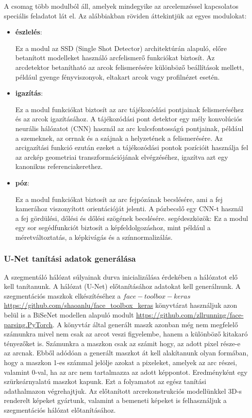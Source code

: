 \documentclass[12pt,a4]{article}
\begin{document}
    A csomag több modulból áll, amelyek mindegyike az arcelemzéssel kapcsolatos speciális feladatot lát el. Az alábbiakban röviden áttekintjük az egyes modulokat:

    \begin{itemize}
        \item \textbf{észlelés}: 
        
        Ez a modul az SSD (Single Shot Detector) architektúrán alapuló, előre betanított modelleket használó arcfelismerő funkciókat biztosít. Az arcdetektor betanítható az arcok felismerésére különböző beállítások mellett, például gyenge fényviszonyok, eltakart arcok vagy profilnézet esetén.

        \item \textbf{igazítás}: 
        
        Ez a modul funkciókat biztosít az arc tájékozódási pontjainak felismeréséhez és az arcok igazításához.
		A tájékozódási pont detektor egy mély konvolúciós neurális hálózatot (CNN) használ az arc kulcsfontosságú pontjainak, például a szemeknek, az orrnak és a szájnak a helyzetének a felismerésére. 
		Az arcigazítási funkció ezután ezeket a tájékozódási pontok pozícióit használja fel az arckép geometriai transzformációjának elvégzéséhez, igazítva azt egy kanonikus referenciakerethez.


        \item \textbf{póz}: 
        
        Ez a modul funkciókat biztosít az arc fejpózának becslésére, ami a fej kamerához viszonyított orientációját jelenti. A pózbecslő egy CNN-t használ a fej gördülési, dőlési és dőlési szögének becslésére.
segédeszközök: Ez a modul egy sor segédfunkciót biztosít a képfeldolgozáshoz, mint például a méretváltoztatás, a képkivágás és a színnormalizálás.

    \end{itemize}

   
    \subsubsection{U-Net tanítási adatok generálása}
    A szegmentáló hálózat súlyainak durva inicializálása érdekében a hálózatot elő kell tanítanunk. A hálózat (U-Net) előtanításához adatokat kell generálnunk. A szegmentációs maszkok elkészítéséhez a $face-toolbox-keras$ \url{https://github.com/shaoanlu/face_toolbox_keras} könyvtárat használjuk azon belül is a BiSeNet modellen alapuló modult \url{https://github.com/zllrunning/face-parsing.PyTorch}. A könyvtár által generált maszk azonban még nem megfelelő számunkra mivel nem csak az arcot veszi figyelembe, hanem a különböző kitakaró tényezőket is. Számunkra a maszkon csak az számit hogy, az adott pixel része-e az arcnak. Ebből adódóan a generált maszkot át kell alakítanunk olyan formában, hogy a maszkon 1-es számmal jelölje azokat a pixeleket, amelyek az arc részei, valamint 0-val, ha az arc nem tartalmazza az adott képpontot. Eredményként egy szürkeárnyalatú maszkot kapunk. Ezt a folyamatot az egész tanítási adathalmazon végrehajtjuk. 
    Az előtanított arcrekonstrukciós modellünkkel 3D-s renderelt képeket gyártunk, valamint a bemeneti képeket is felhasználjuk a szegmentációs hálózat előtanításához.
    
\end{document}
